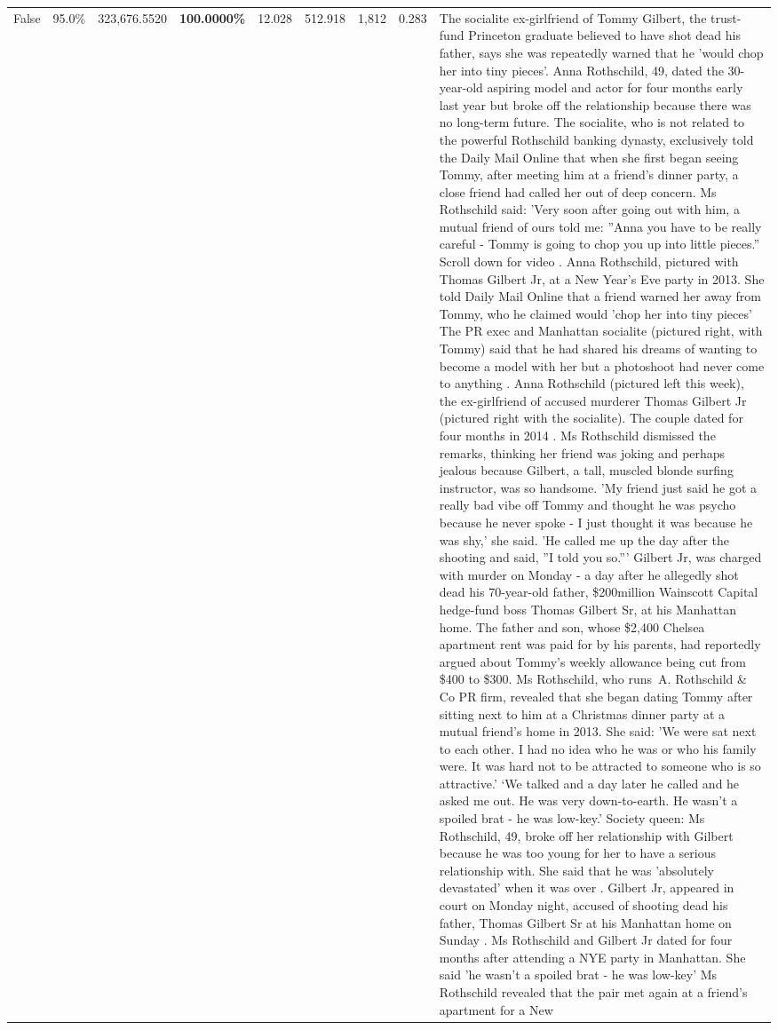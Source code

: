 \begin{table}[H]
\begin{tabular}{lllrlllll}
False & 95.0\% & 323,676.5520 & \bfseries \color{red} 100.0000\% & 12.028 & 512.918 & 1,812 & 0.283 & The socialite ex-girlfriend of Tommy Gilbert, the trust-fund Princeton graduate believed to have shot dead his father, says she was repeatedly warned that he 'would chop her into tiny pieces'. Anna Rothschild, 49, dated the 30-year-old aspiring model and actor for four months early last year but broke off the relationship because there was no long-term future. The socialite, who is not related to the powerful Rothschild banking dynasty, exclusively told the Daily Mail Online that when she first began seeing Tommy, after meeting him at a friend's dinner party, a close friend had called her out of deep concern. Ms Rothschild said: 'Very soon after going out with him, a mutual friend of ours told me: ''Anna you have to be really careful - Tommy is going to chop you up into little pieces.'' Scroll down for video . Anna Rothschild, pictured with Thomas Gilbert Jr, at a New Year's Eve party in 2013. She told Daily Mail Online that a friend warned her away from Tommy, who he claimed would 'chop her into tiny pieces' The PR exec and Manhattan socialite (pictured right, with Tommy) said that he had shared his dreams of wanting to become a model with her but a photoshoot had never come to anything . Anna Rothschild (pictured left this week), the ex-girlfriend of accused murderer Thomas Gilbert Jr (pictured right with the socialite). The couple dated for four months in 2014 . Ms Rothschild dismissed the remarks, thinking her friend was joking and perhaps jealous because Gilbert, a tall, muscled blonde surfing instructor, was so handsome. 'My friend just said he got a really bad vibe off Tommy and thought he was psycho because he never spoke - I just thought it was because he was shy,' she said. 'He called me up the day after the shooting and said, ''I told you so.''' Gilbert Jr, was charged with murder on Monday - a day after he allegedly shot dead his 70-year-old father, \$200million Wainscott Capital hedge-fund boss Thomas Gilbert Sr, at his Manhattan home. The father and son, whose \$2,400 Chelsea apartment rent was paid for by his parents, had reportedly argued about Tommy's weekly allowance being cut from \$400 to \$300. Ms Rothschild, who runs A. Rothschild \& Co PR firm, revealed that she began dating Tommy after sitting next to him at a Christmas dinner party at a mutual friend's home in 2013. She said: 'We were sat next to each other. I had no idea who he was or who his family were. It was hard not to be attracted to someone who is so attractive.' ‘We talked and a day later he called and he asked me out. He was very down-to-earth. He wasn’t a spoiled brat - he was low-key.’ Society queen: Ms Rothschild, 49, broke off her relationship with Gilbert because he was too young for her to have a serious relationship with. She said that he was 'absolutely devastated' when it was over . Gilbert Jr, appeared in court on Monday night, accused of shooting dead his father, Thomas Gilbert Sr at his Manhattan home on Sunday . Ms Rothschild and Gilbert Jr dated for four months after attending a NYE party in Manhattan. She said 'he wasn't a spoiled brat - he was low-key' Ms Rothschild revealed that the pair met again at a friend’s apartment for a New 
\end{tabular}
\end{table}

